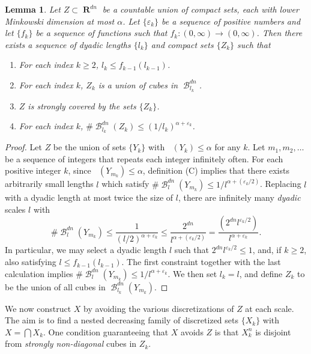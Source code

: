 \documentclass[dvipsnames,letterpaper,12pt]{article}
\numberwithin{equation}{section}
\theoremstyle{plain}
\newtheorem{lemma}{Lemma}
\theoremstyle{remark}
\DeclareMathOperator{\lowminkdim}{\underline{\dim}_{\mathbf{M}}}
\DeclareMathOperator{\RR}{\mathbf{R}}
\DeclareMathOperator{\B}{\mathcal{B}}
\begin{document}
\begin{lemma} \label{coveringlemma}
	Let $Z \subset \RR^{dn}$ be a countable union of compact sets, each with lower Minkowski dimension at most $\alpha$. Let $\{ \varepsilon_k \}$ be a sequence of positive numbers and let $\{ f_k \}$ be a sequence of functions such that $f_k \colon (0,\infty) \to (0,\infty)$. Then there exists a sequence of dyadic lengths $\{ l_k \}$ and compact sets $\{ Z_k \}$ such that
	\begin{enumerate}
		\item For each index $k \geq 2$, $l_k \leq f_{k-1}(l_{k-1})$.
		\item For each index $k$, $Z_k$ is a union of cubes in $\B^{dn}_{l_k}$.
		\item $Z$ is strongly covered by the sets $\{ Z_k \}$.
		\item For each index $k$, $\# \B^{dn}_{l_k}(Z_k) \leq (1/l_k)^{\alpha + \varepsilon_k}$.
	\end{enumerate}
\end{lemma}
\begin{proof}
	Let $Z$ be the union of sets $\{ Y_k \}$ with $\lowminkdim(Y_k) \leq \alpha$ for any $k$. Let $m_1, m_2, \dots$ be a sequence of integers that repeats each integer infinitely often. For each positive integer $k$, since $\lowminkdim(Y_{m_k}) \leq \alpha$, definition (C) implies that there exists arbitrarily small lengths $l$ which satisfy $\# \B_l^{dn}(Y_{m_k}) \leq 1/l^{\alpha + (\varepsilon_k/2)}$. Replacing $l$ with a dyadic length at most twice the size of $l$, there are infinitely many {\it dyadic} scales $l$ with
	\[	\# \B^{dn}_l(Y_{m_k}) \leq \frac{1}{(l/2)^{\alpha + \varepsilon_k}} \leq \frac{2^{dn}}{l^{\alpha + (\varepsilon_k/2)}} = \frac{\left( 2^{dn} l^{\varepsilon_k/2} \right)}{l^{\alpha + \varepsilon_k}}. \]
	In particular, we may select a dyadic length $l$ such that $2^{dn} l^{\varepsilon_k/2} \leq 1$, and, if $k \geq 2$, also satisfying $l \leq f_{k-1}(l_{k-1})$. The first constraint together with the last calculation implies $\# \B^{dn}_l(Y_{m_k}) \leq 1/l^{\alpha + \varepsilon_k}$. We then set $l_k = l$, and define $Z_k$ to be the union of all cubes in $\B_{l_k}^{dn}(Y_{m_k})$.
\end{proof}

We now construct $X$ by avoiding the various discretizations of $Z$ at each scale. The aim is to find a nested decreasing family of discretized sets $\{ X_k \}$ with $X = \bigcap X_k$. One condition guaranteeing that $X$ avoids $Z$ is that $X_k^n$ is disjoint from {\it strongly non-diagonal} cubes in $Z_k$.
\end{document}
